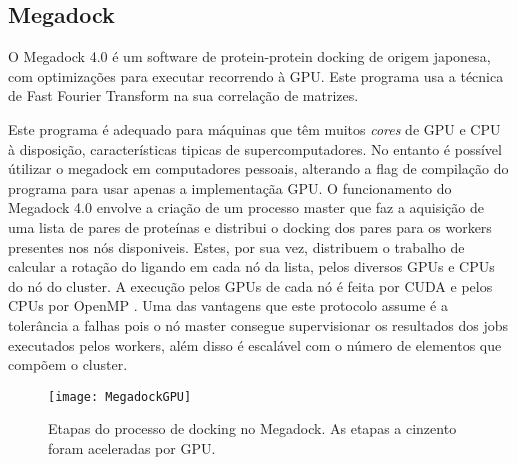\subsection {Megadock}
\label{megaD}
O Megadock 4.0\cite{megadock40} é um software de protein-protein docking de origem japonesa, com optimizações para executar recorrendo à GPU. Este programa usa a técnica de Fast Fourier Transform na sua correlação de matrizes.

Este programa é adequado para máquinas que têm muitos \textit{cores} de GPU e CPU à disposição, características tipicas de supercomputadores. No entanto é possível útilizar o megadock em computadores pessoais, alterando a flag de compilação do programa para usar apenas a implementaçãa GPU.
O funcionamento do Megadock 4.0 envolve a criação de um processo master que faz a aquisição de uma lista de pares de proteínas e distribui o docking dos pares para os workers presentes nos nós disponiveis.
 Estes, por sua vez, distribuem o trabalho de calcular a rotação do ligando em cada nó da lista, pelos diversos GPUs e CPUs do nó do cluster. A execução pelos GPUs de cada nó é feita por CUDA e pelos CPUs por OpenMP . 
 Uma das vantagens que este protocolo assume é a tolerância a falhas pois o nó master consegue supervisionar os resultados dos jobs executados pelos workers, além disso é escalável com o número de elementos que compõem o cluster.

   \begin{figure}[ht]
  \centering
    {\texttt{[image: MegadockGPU]}}
  \caption{Etapas do processo de docking no Megadock. As etapas a cinzento foram aceleradas por GPU\cite{shimoda2015protein}. }
  \label{megadockGPU}
\end{figure}
